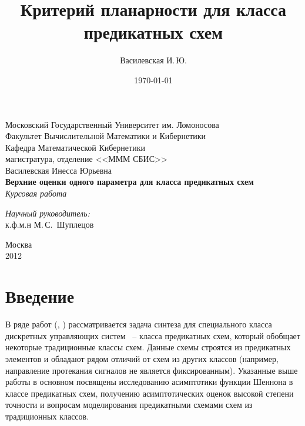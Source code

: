 \documentclass[12pt]{article}
\title{Критерий планарности для класса предикатных схем}
\author{Василевская И.\,Ю.}
\date{\today}
\begin{document}
    \begin{titlepage}
        \begin{center}
            Московский Государственный Университет им. Ломоносова\\
            Факультет Вычислительной Математики и Кибернетики\\
            Кафедра Математической Кибернетики\\
            магистратура, отделение <<МММ СБИС>>\\[6cm]

            \large {Василевская Инесса Юрьевна}\\
            \LARGE \textbf {Верхние оценки одного параметра для класса предикатных схем}\\[0.8cm]
            \large \emph {Курсовая работа}\\[5.0cm]

            \begin{flushright}
                \large
                \begin{minipage}{0.40\textwidth}
                    \begin{flushleft}
                        \emph{Научный руководитель:}\\к.ф.м.н М.\,С.~Шуплецов
                    \end{flushleft}
                \end{minipage}
            \end{flushright}

            \vfill
            Москва\\
			2012
        \end{center}
    \end{titlepage}

\setcounter{page}{2}

\section{Введение}
\label{beginning}
В ряде работ (\cite{Shu09}, \cite{Shu11}) рассматривается задача синтеза для специального класса дискретных управляющих систем ~--
класса предикатных схем, который обобщает некоторые традиционные классы схем. Данные схемы строятся из предикатных элементов
и обладают рядом отличий от схем из других классов (например, направление протекания сигналов не является фиксированным).
Указанные выше работы в основном посвящены исследованию асимптотики функции Шеннона в классе предикатных схем,
 получению асимптотических оценок высокой степени точности и вопросам моделирования предикатными схемами схем из традиционных классов.
\end{document}
